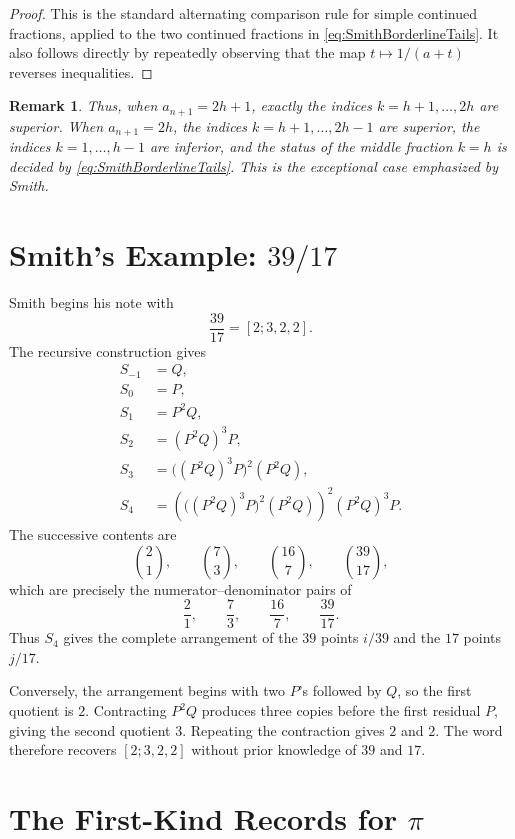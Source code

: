 \documentclass{book}
\newtheorem{remark}[definition]{Remark}
\begin{document}
\begin{proof}
  This is the standard alternating comparison rule for simple continued
  fractions, applied to the two continued fractions in
  \eqref{eq:SmithBorderlineTails}. It also follows directly by repeatedly
  observing that the map \(t\mapsto1/(a+t)\) reverses inequalities.
\end{proof}

\begin{remark}
  Thus, when \(a_{n+1}=2h+1\), exactly the indices
  \(k=h+1,\ldots,2h\) are superior. When \(a_{n+1}=2h\), the indices
  \(k=h+1,\ldots,2h-1\) are superior, the indices
  \(k=1,\ldots,h-1\) are inferior, and the status of the middle fraction
  \(k=h\) is decided by
  \eqref{eq:SmithBorderlineTails}. This is the exceptional case emphasized
  by Smith.
\end{remark}

\section{Smith's Example: \texorpdfstring{\(39/17\)}{39/17}}

Smith begins his note with
\[
  \frac{39}{17}=[2;3,2,2].
\]
The recursive construction gives
\begin{align*}
  S_{-1}&=Q,\\
  S_0&=P,\\
  S_1&=P^2Q,\\
  S_2&=(P^2Q)^3P,\\
  S_3&=\bigl((P^2Q)^3P\bigr)^2(P^2Q),\\
  S_4&=
  \left(\bigl((P^2Q)^3P\bigr)^2(P^2Q)\right)^2
  (P^2Q)^3P.
\end{align*}
The successive contents are
\[
  \binom21,\qquad
  \binom73,\qquad
  \binom{16}{7},\qquad
  \binom{39}{17},
\]
which are precisely the numerator--denominator pairs of
\[
  \frac21,\qquad
  \frac73,\qquad
  \frac{16}{7},\qquad
  \frac{39}{17}.
\]
Thus \(S_4\) gives the complete arrangement of the \(39\) points \(i/39\)
and the \(17\) points \(j/17\).

Conversely, the arrangement begins with two \(P\)'s followed by \(Q\), so
the first quotient is \(2\). Contracting \(P^2Q\) produces three copies
before the first residual \(P\), giving the second quotient \(3\). Repeating
the contraction gives \(2\) and \(2\). The word therefore recovers
\([2;3,2,2]\) without prior knowledge of \(39\) and \(17\).

\section{The First-Kind Records for \texorpdfstring{\(\pi\)}{pi}}
\end{document}
